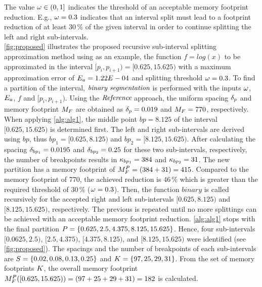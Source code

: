 The value $\omega \in (0,1]$ indicates the threshold of an acceptable memory footprint reduction. 
E.g., $\omega=0.3$ indicates that an interval split must lead to a footprint reduction of at least $30\,\%$ of the given interval in order to continue splitting the left and right sub-intervals.\\
\cref{fig:proposed} illustrates the proposed recursive sub-interval splitting approximation method using as an example, the function $f=log(x)$ to be approximated in the interval $[p_i,p_{i+1})=[0.625,15.625)$ with a maximum approximation error of $E_a=1.22E-04$ and splitting threshold $\omega=0.3$. 
To find a partition of the interval, $\textit{binary segmentation}$ is performed with the inputs $\omega$, $E_a$, $f$ and $[p_i,p_{i+1})$.
Using the $\textit{Reference}$ approach, the uniform spacing $\delta_{p}$ and memory footprint $M_{F}$ are obtained as $\delta_{p}=0.019$ and $M_{F}=770$, respectively.
When applying \cref{alg:alg1}, the middle point $bp=8.125$ of the interval $[0.625,15.625)$ is determined first.
The left and right sub-intervals are derived using $bp$, thus $bp_1=[0.625,8.125)$ and $bp_2=[8.125,15.625)$.
After calculating the spacing $\delta_{bp_1}=0.0195$ and $\delta_{bp_2}=0.25$ for these two sub-intervals, respectively, the number of breakpoints results in $\kappa_{bp_1}=384$ and $\kappa_{bp_2}=31$.
The new partition has a memory footprint of $M_{F}^P=(384+31) = 415$.
Compared to the memory footprint of 770, the achieved reduction is $46\,\%$ which is greater than the required threshold of $30\,\%$ ($\omega=0.3$).
Then, the function $binary$ is called recursively for the accepted right and left sub-intervals $[0.625,8.125)$ and $[8.125,15.625)$, respectively.
The previous is repeated until no more splittings can be achieved with an acceptable memory footprint reduction.
\cref{alg:alg1} stops with the final partition $P=\{0.625,2.5,4.375,8.125,15.625\}$.
Hence, four sub-intervals $[0.0625,2.5)$, $[2.5,4.375)$, $[4.375,8.125)$, and $[8.125,15.625)$ were identified (see \cref{fig:proposed}).
The spacings and the number of breakpoints of each sub-intervals are $S=\{0.02,0.08,0.13,0.25\}$ and $K=\{97,25,29,31\}$.
From the set of memory footprints $K$, the overall memory footprint $M_{F}^P([0.625,15.625))=(97+25+29+31)=182$ is calculated.
